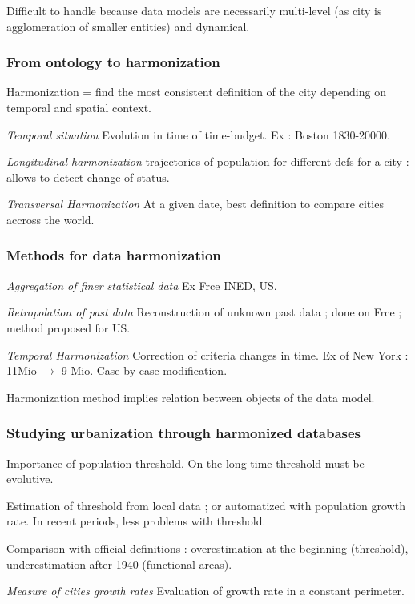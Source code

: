 Difficult to handle because data models are necessarily multi-level (as city is agglomeration of smaller entities) and dynamical.

\subsubsection{From ontology to harmonization}

Harmonization = find the most consistent definition of the city depending on temporal and spatial context.

\textit{Temporal situation} Evolution in time of time-budget. Ex : Boston 1830-20000.

\textit{Longitudinal harmonization} trajectories of population for different defs for a city : allows to detect change of status.

\textit{Transversal Harmonization} At a given date, best definition to compare cities accross the world.


\subsubsection{Methods for data harmonization}

\textit{Aggregation of finer statistical data} Ex Frce INED, US.

\textit{Retropolation of past data} Reconstruction of unknown past data ; done on Frce ; method proposed for US.

\textit{Temporal Harmonization} Correction of criteria changes in time. Ex of New York : 11Mio $\rightarrow$ 9 Mio. Case by case modification.

Harmonization method implies relation between objects of the data model.


\subsubsection{Studying urbanization through harmonized databases}

Importance of population threshold. On the long time threshold must be evolutive.

Estimation of threshold from local data ; or automatized with population growth rate. In recent periods, less problems with threshold.

Comparison with official definitions : overestimation at the beginning (threshold), underestimation after 1940 (functional areas).

\textit{Measure of cities growth rates} Evaluation of growth rate in a constant perimeter.

